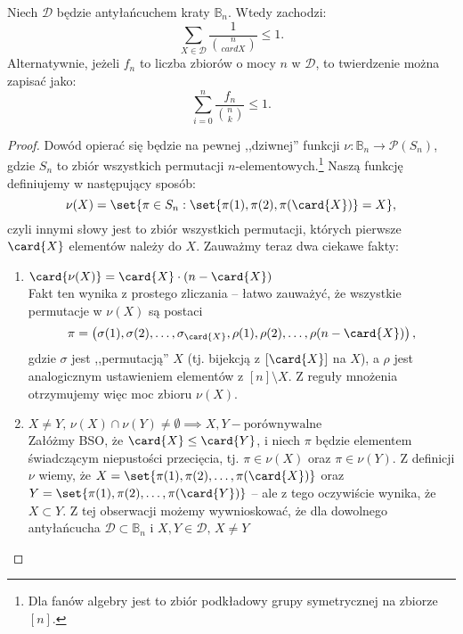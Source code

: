 \begin{theorem}
	Niech $\mathcal{D}$ będzie antyłańcuchem kraty $\mathbb B_n$.
	Wtedy zachodzi:
	\begin{equation}
		\sum_{X \in \mathcal{D}} \frac{1}{\binom{n}{card{X}}} \leq 1.
	\end{equation}
	Alternatywnie, jeżeli $f_n$ to liczba zbiorów o mocy $n$ w $\mathcal{D}$,
	to twierdzenie można zapisać jako:
	\begin{equation}
		\sum_{i=0}^{n} \frac{f_n}{\binom{n}{k}} \leq 1.
	\end{equation}
\end{theorem}

\begin{proof}
	Dowód opierać się będzie na pewnej ,,dziwnej'' funkcji $\nu: \mathbb B_n \to \mathcal{P}(S_n)$,
	gdzie $S_n$ to zbiór wszystkich permutacji $n$-elementowych.\footnote{Dla fanów algebry jest to zbiór podkładowy grupy symetrycznej na zbiorze $[n]$.}
	Naszą funkcję definiujemy w następujący sposób:
	$$\nu(X) = \set{\pi \in S_n: \set{\pi(1), \pi(2), \pi(\card{X})} = X},$$
	czyli innymi słowy jest to zbiór wszystkich permutacji, których pierwsze $\card{X}$
	elementów należy do $X$. Zauważmy teraz dwa ciekawe fakty:
	\begin{enumerate}
		\item $\card{\nu(X)} = \card{X} \cdot (n - \card{X})$ \\
		      Fakt ten wynika z prostego zliczania -- łatwo zauważyć, że wszystkie permutacje
		      w $\nu(X)$ są postaci $$\pi = \left(\sigma(1), \sigma(2), \ldots, \sigma_{\card{X}},
			      \rho(1), \rho(2), \ldots, \rho(n - \card{X})\right),$$
		      gdzie $\sigma$ jest ,,permutacją'' $X$ (tj. bijekcją z $[\card{X}]$ na $X$),
		      a $\rho$ jest analogicznym ustawieniem elementów z $[n] \setminus X$. Z reguły mnożenia
		      otrzymujemy więc moc zbioru $\nu(X)$.
		\item $X \neq Y,\, \nu(X) \cap \nu(Y) \neq \emptyset \implies X, Y - \text{porównywalne}$ \\
		      Załóżmy BSO, że $\card{X} \leq \card{Y}$, i niech $\pi$ będzie elementem świadczącym
		      niepustości przecięcia, tj. $\pi \in \nu(X)$ oraz $\pi \in \nu(Y)$. Z definicji $\nu$
		      wiemy, że $X = \set{\pi(1), \pi(2), \ldots, \pi(\card{X})}$ oraz
		      $Y = \set{\pi(1), \pi(2), \ldots, \pi(\card{Y})}$ -- ale z tego oczywiście
		      wynika, że $X \subset Y$. Z tej obserwacji możemy wywnioskować, że dla dowolnego
		      antyłańcucha $\mathcal{D} \subset \mathbb B_n$ i $X, Y \in \mathcal{D},\, X \neq Y$

\end{enumerate}
\end{proof}
